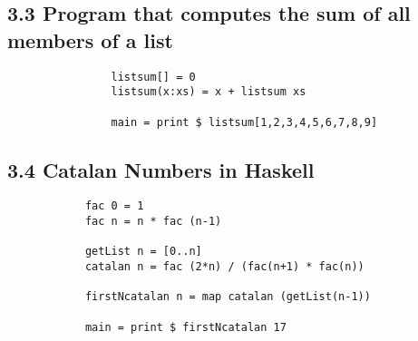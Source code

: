 \documentclass{article}
\begin{document}
	\subsection*{3.3 Program that computes the sum of all members of a list}
	\begin{adjustwidth}{2em}{2em}
		\begin{tcolorbox}
			\begin{verbatim}
				listsum[] = 0
				listsum(x:xs) = x + listsum xs
				
				main = print $ listsum[1,2,3,4,5,6,7,8,9]
			\end{verbatim}
		\end{tcolorbox}		
	\end{adjustwidth}
	
	\subsection*{3.4 Catalan Numbers in Haskell}
	\begin{adjustwidth}{2em}{2em}
	\begin{tcolorbox}
		\begin{verbatim}
			fac 0 = 1
			fac n = n * fac (n-1)
			
			getList n = [0..n]
			catalan n = fac (2*n) / (fac(n+1) * fac(n))
			
			firstNcatalan n = map catalan (getList(n-1))
			
			main = print $ firstNcatalan 17
		\end{verbatim}
	\end{tcolorbox}
	\end{adjustwidth}
\end{document}
